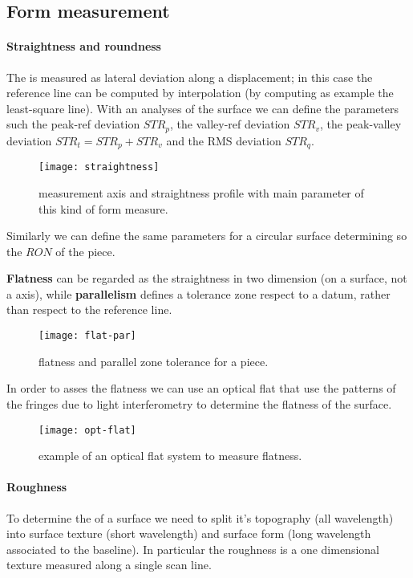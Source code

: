 \subsection{Form measurement}
	\paragraph{Straightness and roundness} The  is measured as lateral deviation along a displacement; in this case the reference line can be computed by interpolation (by computing as example the least-square line). With an analyses of the surface we can define the parameters such the peak-ref deviation $STR_p$, the valley-ref deviation $STR_v$, the peak-valley deviation $STR_t = STR_p + STR_v$ and the RMS deviation $STR_q$.
	
	\begin{SCfigure}[2][bht]
		\centering \texttt{[image: straightness]}
		\caption{measurement axis and straightness profile with main parameter of this kind of form measure.}
	\end{SCfigure}
	
	Similarly we can define the same parameters for a circular surface determining so the  $RON$ of the piece.
	
	\textbf{Flatness} can be regarded as the straightness in two dimension (on a surface, not a axis), while \textbf{parallelism} defines a tolerance zone respect to a datum, rather than respect to the reference line.
	
	\begin{SCfigure}[2][bht]
		\centering \texttt{[image: flat-par]}
		\caption{flatness and parallel zone tolerance for a piece.}
	\end{SCfigure}
	
	In order to asses the flatness we can use an optical flat that use the patterns of the fringes due to light interferometry to determine the flatness of the surface.
	
	\begin{SCfigure}[2][bht]
		\centering \texttt{[image: opt-flat]}
		\caption{example of an optical flat system to measure flatness.}
	\end{SCfigure}
	
	\paragraph{Roughness} To determine the  of a surface we need to split it's topography (all wavelength) into surface texture (short wavelength) and  surface form (long wavelength associated to the baseline). In particular the roughness is a one dimensional texture measured along a single scan line.
	
